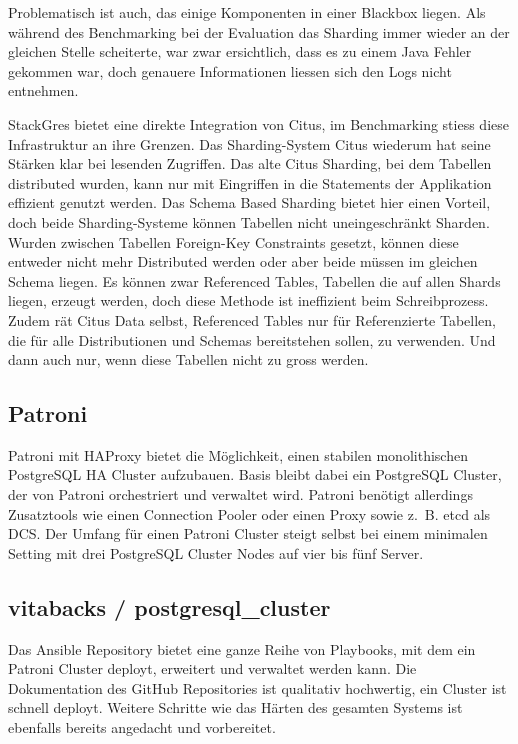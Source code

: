 \begin{flushleft}
    Problematisch ist auch, das einige Komponenten in einer Blackbox liegen.
    Als während des Benchmarking bei der Evaluation das Sharding immer wieder an der gleichen Stelle scheiterte,
    war zwar ersichtlich, dass es zu einem Java Fehler gekommen war, doch genauere Informationen liessen sich den Logs nicht entnehmen.
\end{flushleft}
\begin{flushleft}
    StackGres bietet eine direkte Integration von Citus, im Benchmarking stiess diese Infrastruktur an ihre Grenzen.
    Das Sharding-System Citus wiederum hat seine Stärken klar bei lesenden Zugriffen.
    Das alte Citus Sharding, bei dem Tabellen distributed wurden, kann nur mit Eingriffen in die Statements der Applikation effizient genutzt werden.
    Das Schema Based Sharding bietet hier einen Vorteil, doch beide Sharding-Systeme können Tabellen nicht uneingeschränkt Sharden.
    Wurden zwischen Tabellen Foreign-Key Constraints gesetzt, können diese entweder nicht mehr Distributed werden oder aber beide müssen im gleichen Schema liegen.
    Es können zwar Referenced Tables, Tabellen die auf allen Shards liegen, erzeugt werden, doch diese Methode ist ineffizient beim Schreibprozess.
    Zudem rät Citus Data selbst, Referenced Tables nur für Referenzierte Tabellen, die für alle Distributionen und Schemas bereitstehen sollen, zu verwenden.
    Und dann auch nur, wenn diese Tabellen nicht zu gross werden.
\end{flushleft}
\begin{flushleft}
    \subsection{Patroni}
    Patroni mit \Gls{HAProxy} bietet die Möglichkeit, einen stabilen monolithischen \Gls{PostgreSQL HA Cluster} aufzubauen.
    Basis bleibt dabei ein \Gls{PostgreSQL Cluster}, der von Patroni orchestriert und verwaltet wird.
    Patroni benötigt allerdings Zusatztools wie einen \Gls{Connection Pooler} oder einen Proxy sowie z. B. \gls{etcd} als DCS.
    Der Umfang für einen Patroni Cluster steigt selbst bei einem minimalen Setting mit drei \Gls{PostgreSQL Cluster} Nodes auf vier bis fünf Server.
    \subsection{vitabacks / postgresql\_cluster}
    Das \Gls{Ansible} Repository bietet eine ganze Reihe von Playbooks, mit dem ein Patroni Cluster deployt, erweitert und verwaltet werden kann.
    Die Dokumentation des \Gls{GitHub} Repositories ist qualitativ hochwertig, ein Cluster ist schnell deployt.
    Weitere Schritte wie das Härten des gesamten Systems ist ebenfalls bereits angedacht und vorbereitet.
\end{flushleft}
